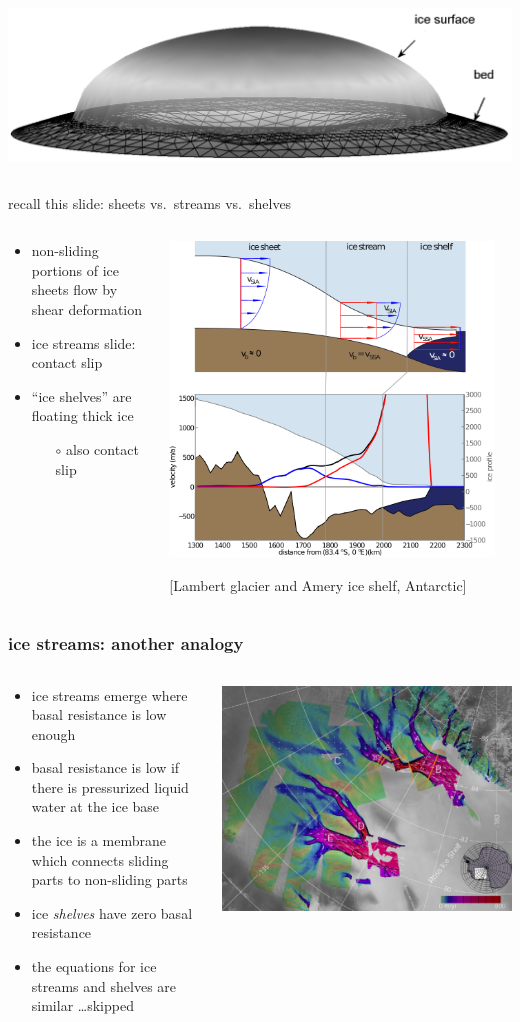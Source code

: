 \documentclass[10pt,hyperref={pdfpagelabels=true}]{beamer}
\newcommand{\contactslipslide}[1]{
\begin{frame}{#1 sheets vs.~streams vs.~shelves}

\begin{columns}
\begin{column}{0.35\textwidth}
\small
\begin{itemize}
\small
\item non-sliding portions of ice sheets flow by shear deformation
\item ice streams slide: \alert{contact slip}
\item ``ice shelves'' are floating thick ice
  \begin{itemize}
  \scriptsize
  \item[$\circ$] also \alert{contact slip}
  \end{itemize}
\end{itemize}
\end{column}

\begin{column}{0.65\textwidth}

\hfill\includegraphics[width=0.95\textwidth]{siassacartoon-lambert}

\begin{center}
\vspace{-0.18in}
\tiny [Lambert glacier and Amery ice shelf, Antarctic]
\end{center}
\end{column}
\end{columns}
\end{frame}
}
\begin{document}
\begin{frame}
\begin{columns}
\begin{column}{0.65\textwidth}
\begin{center}
\includegraphics[width=\textwidth]{capnonflatobs}
\end{center}
\end{column}
\end{columns}
\end{frame}



\contactslipslide{recall this slide:}


\begin{frame}
  \frametitle{ice streams: another analogy}

\begin{columns}
\begin{column}{0.6\textwidth}
\begin{itemize}
\item ice streams emerge where basal resistance is low enough
\item basal resistance is low if there is pressurized liquid water at the ice base
\item the ice is a membrane which connects sliding parts to non-sliding parts

\bigskip
\item<2> ice \emph{shelves} have zero basal resistance
\item<2> the equations for ice streams and shelves are similar \dots skipped
\end{itemize}
\end{column}
\begin{column}{0.4\textwidth}
\includegraphics[width=\textwidth]{siple}


\end{column}
\end{columns}
\end{frame}
\end{document}
